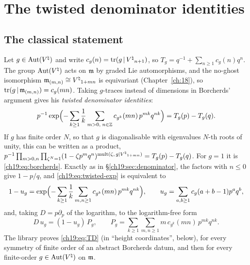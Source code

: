 \section{The twisted denominator identities}\label{ch19:sec:twisted}

\subsection{The classical statement}

Let $g\in\operatorname{Aut}({V^{\natural}})$ and write $c_g(n)=\operatorname{tr}(g\,|\,{V^{\natural}}_{n+1})$, so $T_g=q^{-1}+\sum_{n\ge1}c_g(n)q^n$.  The group $\operatorname{Aut}({V^{\natural}})$
acts on $\mathfrak{m}$ by graded Lie automorphisms, and the no-ghost isomorphism $\mathfrak{m}_{(m,n)}\cong{V^{\natural}}_{1+mn}$ is
equivariant (Chapter~\ref{ch:18}), so $\operatorname{tr}(g\,|\,\mathfrak{m}_{(m,n)})=c_g(mn)$.  Taking $g$-traces instead of dimensions in
Borcherds' argument gives his \emph{twisted denominator identities}:
\begin{equation}\label{ch19:eq:twisted-exp}
  p^{-1}\exp\Bigl(-\sum_{k\ge1}\frac1k\sum_{m>0,\;n\in{\mathbb{Z}}}c_{g^k}(mn)\,p^{mk}q^{nk}\Bigr)=T_g(p)-T_g(q) .
\end{equation}
If $g$ has finite order $N$, so that $g$ is diagonalisable with eigenvalues $N$-th roots of unity, this can be written as a
product, $p^{-1}\prod_{m>0,n}\prod_{\zeta^N=1}(1-\zeta p^mq^n)^{\mathrm{mult}(\zeta,\,g|{V^{\natural}}_{1+mn})}=T_g(p)-T_g(q)$.  For $g=1$
it is \eqref{ch19:eq:borcherds}.  Exactly as in \S\ref{ch19:sec:denominator}, the factors with $n\le0$ give $1-p/q$, and
\eqref{ch19:eq:twisted-exp} is equivalent to
\begin{equation}\label{ch19:eq:twisted-u}
  1-u_g=\exp\Bigl(-\sum_{k\ge1}\frac1k\sum_{m,n\ge1}c_{g^k}(mn)\,p^{mk}q^{nk}\Bigr),\qquad u_g=\sum_{a,b\ge1}c_g(a+b-1)p^aq^b,
\end{equation}
and, taking $D=p\partial_p$ of the logarithm, to the logarithm-free form
\begin{equation}\label{ch19:eq:TD}
  D\,u_g=(1-u_g)\,P_g,\qquad P_g=\sum_{k\ge1}\sum_{m,n\ge1}m\,c_{g^k}(mn)\,p^{mk}q^{nk}.\tag{TD$_g$}
\end{equation}
The library proves \eqref{ch19:eq:TD} (in ``height coordinates'', below), for every symmetry of finite order of an
abstract Borcherds datum, and then for every finite-order $g\in\operatorname{Aut}({V^{\natural}})$ on $\mathfrak{m}$.

